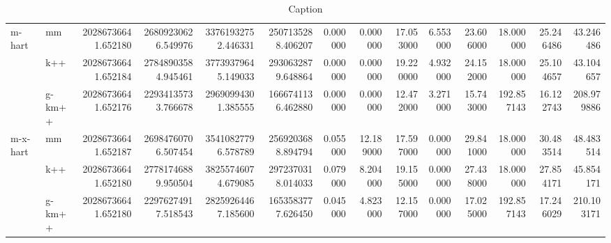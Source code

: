 \begin{table}[!ht]
{\begin{tabular}{llrrrrrrrrrrrr}
\cline{1-14}
\multirow[t]{3}{*}{m-hart} & mm & 20286736641.652180 & 26809230626.549976 & 33761932752.446331 & 2507135288.406207 & 0.000000 & 0.000000 & 17.053000 & 6.553000 & 23.606000 & 18.000000 & 25.246486 & 43.246486 \\
 & k++ & 20286736641.652184 & 27848903584.945461 & 37739379645.149033 & 2930632879.648864 & 0.000000 & 0.000000 & 19.220000 & 4.932000 & 24.152000 & 18.000000 & 25.104657 & 43.104657 \\
 & g-km++ & 20286736641.652176 & 22934135733.766678 & 29690994301.385555 & 1666741136.462880 & 0.000000 & 0.000000 & 12.472000 & 3.271000 & 15.743000 & 192.857143 & 16.122743 & 208.979886 \\
\cline{1-14}
\multirow[t]{3}{*}{m-x-hart} & mm & 20286736641.652187 & 26984760706.507454 & 35410827796.578789 & 2569203688.894794 & 0.055000 & 12.189000 & 17.597000 & 0.000000 & 29.841000 & 18.000000 & 30.483514 & 48.483514 \\
 & k++ & 20286736641.652180 & 27781746889.950504 & 38255746074.679085 & 2972370318.014033 & 0.079000 & 8.204000 & 19.155000 & 0.000000 & 27.438000 & 18.000000 & 27.854171 & 45.854171 \\
 & g-km++ & 20286736641.652180 & 22976274917.518543 & 28259264467.185600 & 1653583777.626450 & 0.045000 & 4.823000 & 12.157000 & 0.000000 & 17.025000 & 192.857143 & 17.246029 & 210.103171 \\
\cline{1-14}
\hline
\end{tabular}
}

\caption{Caption}
\label{tab:my_label}
\end{table}